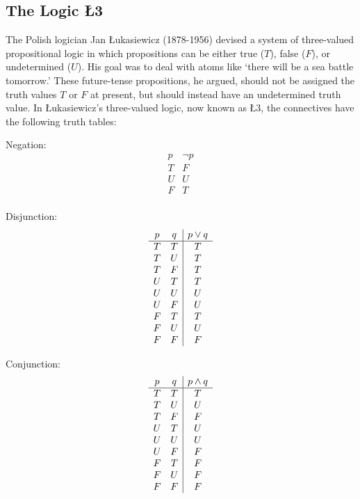 \documentclass[11pt]{article}
\theoremstyle{definition}
\theoremstyle{remark}
\begin{document}
\subsection{The Logic Ł3}
The Polish logician Jan Łukasiewicz (1878-1956) devised a system of three-valued propositional logic in which propositions can be either true ($T$), false ($F$), or undetermined ($U$). His goal was to deal with atoms like `there will be a sea battle tomorrow.' These future-tense propositions, he argued, should not be assigned the truth values $T$ or $F$ at present, but should instead have an undetermined truth value. In Łukasiewicz's three-valued logic, now known as Ł3, the connectives have the following truth tables:\par
\vspace{12pt}
\noindent
Negation: 
\[
\begin{array}{c|c}
p & \lnot p \\
\hline
T & F \\
U & U \\
F & T \\
\end{array}
\]\par

\noindent
Disjunction: 
\[
\begin{array}{c c|c}
p & q & p \lor q \\
\hline
T & T & T \\
T & U & T \\
T & F & T \\
U & T & T \\
U & U & U \\
U & F & U \\
F & T & T \\
F & U & U \\
F & F & F \\
\end{array}
\]\par

\noindent
Conjunction: 
\[
\begin{array}{c c|c}
p & q & p \wedge q \\
\hline
T & T & T \\
T & U & U \\
T & F & F \\
U & T & U \\
U & U & U \\
U & F & F \\
F & T & F \\
F & U & F \\
F & F & F \\
\end{array}
\]\par
\end{document}
